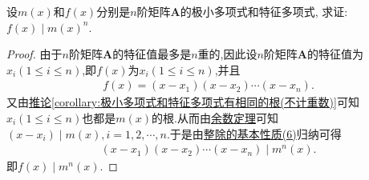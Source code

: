 \documentclass[../../main.tex]{subfiles}
\begin{document}
\begin{example}
设\(m(x)\)和\(f(x)\)分别是\(n\)阶矩阵\(\boldsymbol{A}\)的极小多项式和特征多项式, 求证: \(f(x)\mid m(x)^n\).
\end{example}
\begin{proof}
由于\(n\)阶矩阵\(\boldsymbol{A}\)的特征值最多是\(n\)重的,因此设\(n\)阶矩阵\(\boldsymbol{A}\)的特征值为$x_i(1\leq i\leq n)$,即$f(x)$为$x_i(1\leq i\leq n)$,并且
\begin{align*}
f(x)=(x-x_1)(x-x_2)\cdots(x-x_n).
\end{align*}
又由\hyperref[corollary:极小多项式和特征多项式有相同的根(不计重数)]{推论\ref{corollary:极小多项式和特征多项式有相同的根(不计重数)}}可知$x_i(1\leq i\leq n)$也都是$m(x)$的根.从而由\hyperref[theorem:余数定理]{余数定理}可知$(x-x_i)\mid m(x),i=1,2,\cdots,n$.于是由\hyperref[proposition:整除的基本性质]{整除的基本性质(6)}归纳可得
\begin{align*}
(x-x_1)(x-x_2)\cdots(x-x_n)\mid m^n(x).
\end{align*}
即$f(x)\mid m^n(x)$.
\end{proof}
\end{document}
